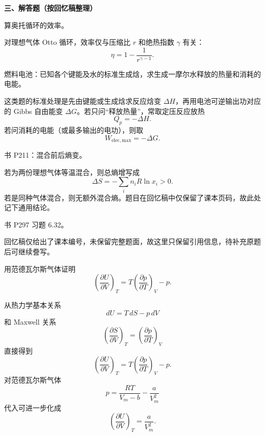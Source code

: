 \textbf{三、解答题（按回忆稿整理）}
\begin{question}
算奥托循环的效率。
\begin{solution}
对理想气体 Otto 循环，效率仅与压缩比 $r$ 和绝热指数 $\gamma$ 有关：
\[
\eta=1-\frac{1}{r^{\gamma-1}}.
\]
\end{solution}
\end{question}

\begin{question}
燃料电池：已知各个键能及水的标准生成焓，求生成一摩尔水释放的热量和消耗的电能。
\begin{solution}
这类题的标准处理是先由键能或生成焓求反应焓变 $\Delta H$，再用电池可逆输出功对应的 Gibbs 自由能变 $\Delta G$。若只问“释放热量”，常取定压反应放热
\[
Q_p=-\Delta H.
\]
若问消耗的电能（或最多输出的电功），则取
\[
W_{\mathrm{elec,max}}=-\Delta G.
\]
\end{solution}
\end{question}

\begin{question}
书 P211：混合前后熵变。
\begin{solution}
若为两份理想气体等温混合，则总熵增写成
\[
\Delta S=-\sum_i n_iR\ln x_i>0.
\]
若是同种气体混合，则无额外混合熵。题目在回忆稿中仅保留了课本页码，故此处记下通用结论。
\end{solution}
\end{question}

\begin{question}
书 P297 习题 6.32。
\begin{solution}
回忆稿仅给出了课本编号，未保留完整题面，故这里只保留引用信息，待补充原题后可继续誊写。
\end{solution}
\end{question}

\begin{question}
用范德瓦尔斯气体证明
\[
\left(\frac{\partial U}{\partial V}\right)_T=T\left(\frac{\partial p}{\partial T}\right)_V-p.
\]
\begin{solution}
从热力学基本关系
\[
dU=T\,dS-p\,dV
\]
和 Maxwell 关系
\[
\left(\frac{\partial S}{\partial V}\right)_T=\left(\frac{\partial p}{\partial T}\right)_V
\]
直接得到
\[
\left(\frac{\partial U}{\partial V}\right)_T=T\left(\frac{\partial p}{\partial T}\right)_V-p.
\]
对范德瓦尔斯气体
\[
p=\frac{RT}{V_m-b}-\frac{a}{V_m^2}
\]
代入可进一步化成
\[
\left(\frac{\partial U}{\partial V}\right)_T=\frac{a}{V_m^2}.
\]
\end{solution}
\end{question}

